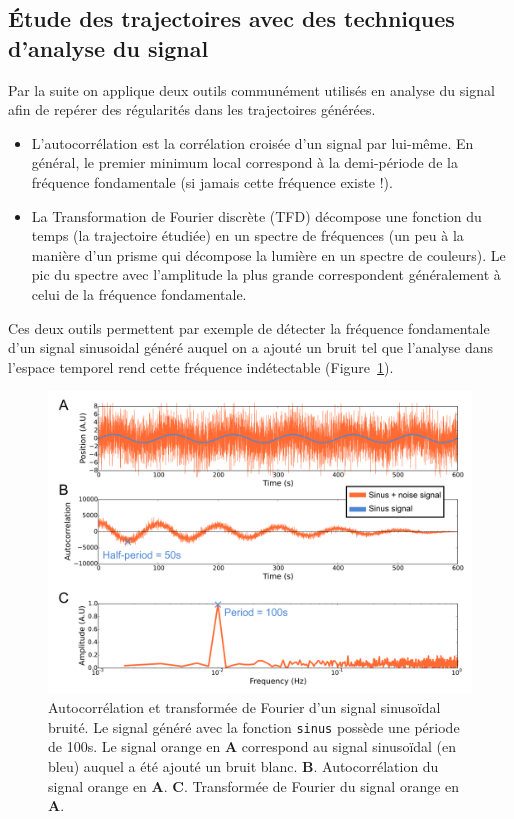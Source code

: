 \documentclass[12pt,a4paper,twoside,openright]{book}
\begin{document}
\subsection{Étude des trajectoires avec des techniques d'analyse du
signal}\label{uxe9tude-des-trajectoires-avec-des-techniques-danalyse-du-signal}

Par la suite on applique deux outils communément utilisés en analyse du
signal afin de repérer des régularités dans les trajectoires générées.

\begin{itemize}
\item
  L'autocorrélation est la corrélation croisée d'un signal par lui-même.
  En général, le premier minimum local correspond à la demi-période de
  la fréquence fondamentale (si jamais cette fréquence existe !).
\item
  La Transformation de Fourier discrète (TFD) décompose une fonction du
  temps (la trajectoire étudiée) en un spectre de fréquences (un peu à
  la manière d'un prisme qui décompose la lumière en un spectre de
  couleurs). Le pic du spectre avec l'amplitude la plus grande
  correspondent généralement à celui de la fréquence fondamentale.
\end{itemize}

Ces deux outils permettent par exemple de détecter la fréquence
fondamentale d'un signal sinusoidal généré auquel on a ajouté un bruit
tel que l'analyse dans l'espace temporel rend cette fréquence
indétectable (Figure~\ref{fig:simu-oscill-sinus}).

\begin{figure}[htbp]
\centering
\includegraphics{figures/annexes/simu_oscill_sinus.png}
\caption{\label{fig:simu-oscill-sinus}Autocorrélation et transformée de
Fourier d'un signal sinusoïdal bruité. Le signal généré avec la fonction
\texttt{sinus} possède une période de 100s. Le signal orange en
\textbf{A} correspond au signal sinusoïdal (en bleu) auquel a été ajouté
un bruit blanc. \textbf{B}. Autocorrélation du signal orange en
\textbf{A}. \textbf{C}. Transformée de Fourier du signal orange en
\textbf{A}.}
\end{figure}
\end{document}
